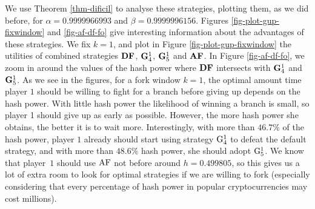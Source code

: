 \begin{comment}
\end{eqnarray*}
    Also, for nonnegative integers $a,b,r$ such that $r>a$, let $\theta_{a,b}^r$ be the
 amount of such paths from $(0,0)$ to $(r,b)$ that do not exit the pentagon
 $\{(0,0),(a,0),(r,r-a),(r,b),(0,b)\}$. Then we have the following:
 $$
\theta_{a,b}^r = \displaystyle \sigma_{|b-r|,\min(r,b)} + \sum_{i=\max(1,r-b+1)}^a  \bigg(\sum_{j=0}^{r-i}\sigma_{i-1,j}\cdot \sigma_{i+b-r,r-i-j} \bigg).
 $$
 \end{lemma}
 For the proof, we write the utility as given in Definition \ref{def-utility}, separate the summation 
 over the five cases explained above, and then show that these sums can be expressed in terms of the 
 generating polynomials associated to the sequences $\sigma_{a,b}$ and $\theta_{a,b}^r$, which we
refer to as \textit{Trapezoidal and Pentagonal Dyck polynomials}.
\qed

\medskip
\end{comment}

We use Theorem \ref{thm-dificil} to analyse these strategies, plotting them, as we did before, 
for $\alpha = 0.9999966993$ and $\beta = 0.9999996156$. Figures  \ref{fig-plot-gup-fixwindow} and \ref{fig-af-df-fo} give 
interesting 
information about the advantages of these strategies. 
We fix $k = 1$, and plot in Figure \ref{fig-plot-gup-fixwindow} the utilities of combined strategies $\text{\rm {\bf DF}}$, ${\rm {\bf G}}^1_4$, ${\rm {\bf G}}^1_5$ and $\text{\rm {\bf AF}}$. In Figure \ref{fig-af-df-fo}, we zoom in around the values of the hash power where $\text{\rm {\bf DF}}$ intersects with ${\rm {\bf G}}^1_4$ and ${\rm {\bf G}}^1_5$.
As we see in the figures, for a 
fork window $k = 1$, the optimal amount time player $1$ should be willing to fight for a branch before giving up depends on the hash power. With little hash power the likelihood of winning a 
branch is small, so player 1 should give up as early as possible. However, the more hash power she obtains, the better it is to wait more. Interestingly, with more than 
$46.7\%$ of the hash power, player $1$ already should start using strategy ${\rm {G}}^1_4$ to defeat the default strategy, and with more than $48.6\%$ hash power, she should adopt ${\rm {G}}^1_5$. We know that player~$1$ should use $\text{\rm AF}$ not before around $h = 0.499805$, so this gives us a lot of extra room to look for optimal strategies if we are willing to fork (especially considering that every percentage of hash power in popular cryptocurrencies 
may cost millions).

